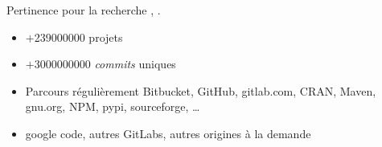 \documentclass[usenames,dvipsnames,10pt]{beamer}
\newcommand{\mycite}[1]{%
    \citeauthor{#1} \citeyear{#1} \cite{#1}%
}
\begin{document}
\begin{frame}{Pertinence pour la recherche}
    \mycite{swh-2019}, \mycite{swh-seirl}.

    \begin{itemize}
        \item $+$\num{239000000} projets
        \item $+$\num{3000000000} \emph{commits} uniques
        \item Parcours régulièrement Bitbucket, GitHub, gitlab.com, CRAN, Maven,
            gnu.org, NPM, pypi, sourceforge, \ldots
        \item google code, autres GitLabs, autres origines à la demande
    \end{itemize}

\end{frame}
\end{document}

